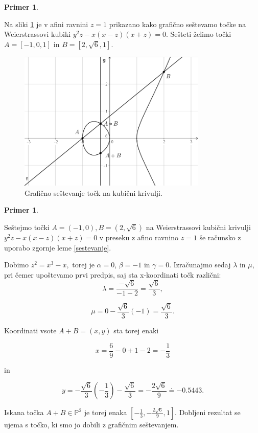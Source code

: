 \documentclass[12pt,a4paper,twoside]{article}
\theoremstyle{definition} %
\newtheorem{primer}[definicija]{Primer}
\theoremstyle{plain} %
\numberwithin{equation}{section}  %
\newcommand{\PP}{\mathbb P}
\begin{document}
\begin{primer}~

Na sliki \ref{fig:adicija} je v afini ravnini $z=1$ prikazano kako grafično seštevamo točke na Weierstrassovi kubiki $y^2z-x(x-z)(x+z)=0$. Sešteti želimo točki $A =[-1,0,1]$ in $B=[2,\sqrt{6},1] $.
\\


\begin{figure}[h]
  \centering
  \includegraphics[width=0.8\textwidth]{images/adicija.png}
  \caption[Grafično seštevanje.]{Grafično seštevanje točk na kubični krivulji.}
  \label{fig:adicija}
\end{figure}

\end{primer}



\begin{primer}~

Seštejmo točki $A =(-1,0),B=(2,\sqrt{6}) $ na Weierstrassovi kubični krivulji $y^2z-x(x-z)(x+z)=0$ v preseku z afino ravnino $z=1$ še računsko z uporabo zgornje leme \ref{sestevanje}.

Dobimo $z^2 = x^3-x,$
torej je $\alpha = 0$, $\beta = -1$ in $\gamma=0$. Izračunajmo sedaj $\lambda$ in $\mu$, pri čemer upoštevamo prvi predpis, saj sta x-koordinati točk različni:
$$\lambda = \frac{-\sqrt{6}}{-1-2} = \frac{\sqrt{6}}{3},$$

$$\mu = 0 - \frac{\sqrt{6}}{3} (-1) = \frac{\sqrt{6}}{3}.$$

Koordinati vsote $A+B=(x,y)$ sta torej enaki

$$x = \frac{6}{9} - 0+1-2=-\frac{1}{3}$$

in

$$y = -\frac{\sqrt{6}}{3}(-\frac{1}{3})-\frac{\sqrt{6}}{3}=-\frac{2\sqrt{6}}{9} \doteq -0.5443.$$

Iskana točka $A+B \in \PP^2$ je torej enaka $[-\frac{1}{3},-\frac{2\sqrt{6}}{9},1]$. Dobljeni rezultat se ujema s točko, ki smo jo dobili z grafičnim seštevanjem.

\end{primer}
\end{document}
